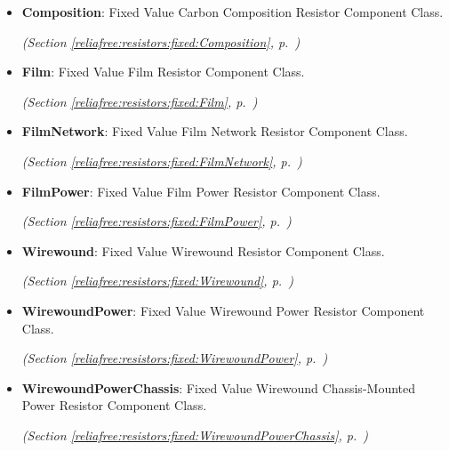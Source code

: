 \begin{itemize}  \setlength{\parskip}{0ex}
  \item \textbf{Composition}: Fixed Value Carbon Composition Resistor Component Class.



  \textit{(Section \ref{reliafree:resistors:fixed:Composition}, p.~\pageref{reliafree:resistors:fixed:Composition})}

  \item \textbf{Film}: Fixed Value Film Resistor Component Class.



  \textit{(Section \ref{reliafree:resistors:fixed:Film}, p.~\pageref{reliafree:resistors:fixed:Film})}

  \item \textbf{FilmNetwork}: Fixed Value Film Network Resistor Component Class.



  \textit{(Section \ref{reliafree:resistors:fixed:FilmNetwork}, p.~\pageref{reliafree:resistors:fixed:FilmNetwork})}

  \item \textbf{FilmPower}: Fixed Value Film Power Resistor Component Class.



  \textit{(Section \ref{reliafree:resistors:fixed:FilmPower}, p.~\pageref{reliafree:resistors:fixed:FilmPower})}

  \item \textbf{Wirewound}: Fixed Value Wirewound Resistor Component Class.



  \textit{(Section \ref{reliafree:resistors:fixed:Wirewound}, p.~\pageref{reliafree:resistors:fixed:Wirewound})}

  \item \textbf{WirewoundPower}: Fixed Value Wirewound Power Resistor Component Class.



  \textit{(Section \ref{reliafree:resistors:fixed:WirewoundPower}, p.~\pageref{reliafree:resistors:fixed:WirewoundPower})}

  \item \textbf{WirewoundPowerChassis}: Fixed Value Wirewound Chassis-Mounted Power Resistor Component Class.



  \textit{(Section \ref{reliafree:resistors:fixed:WirewoundPowerChassis}, p.~\pageref{reliafree:resistors:fixed:WirewoundPowerChassis})}

\end{itemize}

